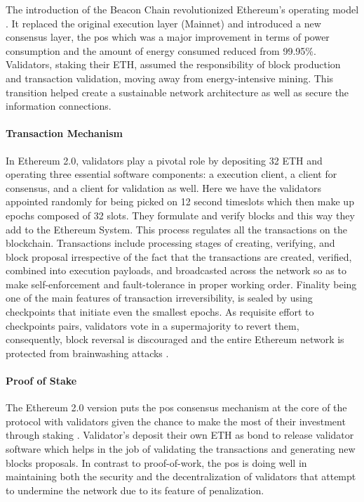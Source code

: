 The introduction of the Beacon Chain revolutionized Ethereum's operating model \cite{ethereummerge}. It replaced the original execution layer (Mainnet) and introduced a new consensus layer, 
the \gls{pos} which was a major improvement in terms of power consumption and the amount of energy consumed reduced from 99.95\%. Validators, staking their ETH, assumed the 
responsibility of block production and transaction validation, moving away from energy-intensive mining. This transition helped create a sustainable network 
architecture as well as secure the information connections.

\paragraph{Transaction Mechanism}

In Ethereum 2.0, validators play a pivotal role by depositing 32 ETH and operating three essential software components: a execution client, a client for consensus, and a client for 
validation as well. Here we have the validators appointed randomly for being picked on 12 second timeslots which then make up epochs composed of 32 slots. They formulate 
and verify blocks and this way they add to the Ethereum System. This process regulates all the transactions on the blockchain. Transactions include processing stages of 
creating, verifying, and block proposal irrespective of the fact that the transactions are created, verified, combined into execution payloads, and broadcasted across 
the network so as to make self-enforcement and fault-tolerance in proper working order. Finality being one of the main features of transaction irreversibility, is 
sealed by using checkpoints that initiate even the smallest epochs. As requisite effort to checkpoints pairs, validators vote in a supermajority to revert them, 
consequently, block reversal is discouraged and the entire Ethereum network is protected from brainwashing attacks \cite{ethereumpos}.

\paragraph{Proof of Stake}

The Ethereum 2.0 version puts the \gls{pos} consensus mechanism at the core of the protocol with validators given the chance to make the most of their 
investment through staking \cite{ethereumpos}. Validator's deposit their own ETH as bond to release validator software which helps in the job of validating the transactions and 
generating new blocks proposals. In contrast to proof-of-work, the \gls{pos} is doing well in maintaining both the security and the decentralization of validators that 
attempt to undermine the network due to its feature of penalization.

